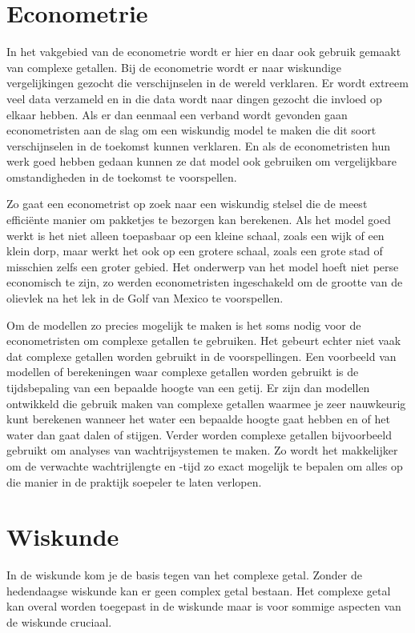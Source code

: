 \documentclass[11pt,fleqn]{book} %
\begin{document}
\section{Econometrie}
In het vakgebied van de econometrie wordt er hier en daar ook gebruik gemaakt van complexe getallen. Bij de econometrie wordt er naar wiskundige vergelijkingen gezocht die verschijnselen in de wereld verklaren. Er wordt extreem veel data verzameld en in die data wordt naar dingen gezocht die invloed op elkaar hebben. Als er dan eenmaal een verband wordt gevonden gaan econometristen aan de slag om een wiskundig model te maken die dit soort verschijnselen in de toekomst kunnen verklaren. En als de econometristen hun werk goed hebben gedaan kunnen ze dat model ook gebruiken om vergelijkbare omstandigheden in de toekomst te voorspellen.

Zo gaat een econometrist op zoek naar een wiskundig stelsel die de meest efficiënte manier om pakketjes te bezorgen kan berekenen. Als het model goed werkt is het niet alleen toepasbaar op een kleine schaal, zoals een wijk of een klein dorp, maar werkt het ook op een grotere schaal, zoals een grote stad of misschien zelfs een groter gebied. Het onderwerp van het model hoeft niet perse economisch te zijn, zo werden econometristen ingeschakeld om de grootte van de olievlek na het lek in de Golf van Mexico te voorspellen.

Om de modellen zo precies mogelijk te maken is het soms nodig voor de econometristen om complexe getallen te gebruiken. Het gebeurt echter niet vaak dat complexe getallen worden gebruikt in de voorspellingen. Een voorbeeld van modellen of berekeningen waar complexe getallen worden gebruikt is de tijdsbepaling van een bepaalde hoogte van een getij. Er zijn dan modellen ontwikkeld die gebruik maken van complexe getallen waarmee je zeer nauwkeurig kunt berekenen wanneer het water een bepaalde hoogte gaat hebben en of het water dan gaat dalen of stijgen. Verder worden complexe getallen bijvoorbeeld gebruikt om analyses van wachtrijsystemen te maken. Zo wordt het makkelijker om de verwachte wachtrijlengte en -tijd zo exact mogelijk te bepalen om alles op die manier in de praktijk soepeler te laten verlopen.\cite{groenendijk}

\section{Wiskunde}
In de wiskunde kom je de basis tegen van het complexe getal. Zonder de hedendaagse wiskunde kan er geen complex getal bestaan. Het complexe getal kan overal worden toegepast in de wiskunde maar is voor sommige aspecten van de wiskunde cruciaal. 
\end{document}
